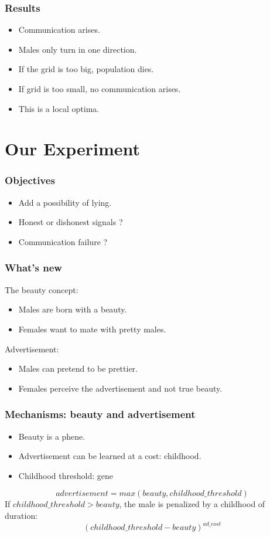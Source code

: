 \documentclass{beamer}
\begin{document}
\begin{frame}
\frametitle{Results}
\begin{itemize}
\item Communication arises.
\item Males only turn in one direction.
\item If the grid is too big, population dies.
\item If grid is too small, no communication arises.
\item This is a local optima.
\end{itemize}
\end{frame}

\section{Our Experiment}

\begin{frame}
\frametitle{Objectives}
\begin{itemize}
\item Add a possibility of lying.
\item Honest or dishonest signals ?
\item Communication failure ?
\end{itemize}
\end{frame}

\begin{frame}
\frametitle{What's new}
The beauty concept:
\begin{itemize}
\item Males are born with a beauty.
\item Females want to mate with pretty males.
\end{itemize}
\vspace{0.5cm}
Advertisement:
\begin{itemize}
\item Males can pretend to be prettier.
\item Females perceive the advertisement and not true beauty.
\end{itemize}
\end{frame}

\begin{frame}
\frametitle{Mechanisms: beauty and advertisement}
\begin{itemize}
\item Beauty is a phene.
\item Advertisement can be learned at a cost: childhood.
\item Childhood threshold: gene
\end{itemize}
$$advertisement=max(beauty, childhood\_threshold)$$
If $childhood\_threshold>beauty$, the male is penalized by a childhood of duration:
$$(childhood\_threshold-beauty)^{ad\_cost}$$
\end{frame}
\end{document}
